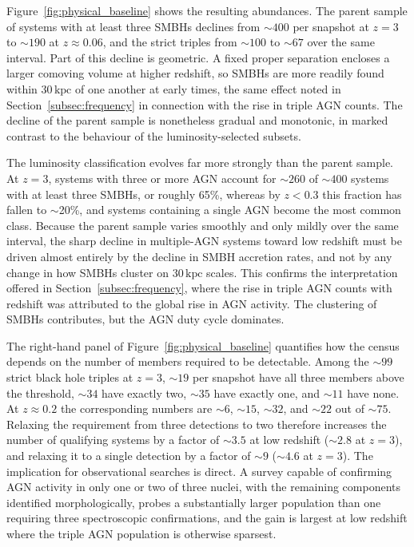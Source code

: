 \documentclass[twocolumn, 10pt]{article}
\begin{document}
Figure~\ref{fig:physical_baseline} shows the resulting abundances. The parent sample of systems with at least three SMBHs declines from $\sim 400$ per snapshot at $z = 3$ to $\sim 190$ at $z \approx 0.06$, and the strict triples from $\sim 100$ to $\sim 67$ over the same interval. Part of this decline is geometric. A fixed proper separation encloses a larger comoving volume at higher redshift, so SMBHs are more readily found within $30\,\mathrm{kpc}$ of one another at early times, the same effect noted in Section~\ref{subsec:frequency} in connection with the rise in triple AGN counts. The decline of the parent sample is nonetheless gradual and monotonic, in marked contrast to the behaviour of the luminosity-selected subsets.

The luminosity classification evolves far more strongly than the parent sample. At $z = 3$, systems with three or more AGN account for $\sim 260$ of $\sim 400$ systems with at least three SMBHs, or roughly 65\%, whereas by $z < 0.3$ this fraction has fallen to $\sim$20\%, and systems containing a single AGN become the most common class. Because the parent sample varies smoothly and only mildly over the same interval, the sharp decline in multiple-AGN systems toward low redshift must be driven almost entirely by the decline in SMBH accretion rates, and not by any change in how SMBHs cluster on $30\,\mathrm{kpc}$ scales. This confirms the interpretation offered in Section~\ref{subsec:frequency}, where the rise in triple AGN counts with redshift was attributed to the global rise in AGN activity. The clustering of SMBHs contributes, but the AGN duty cycle dominates.

The right-hand panel of Figure~\ref{fig:physical_baseline} quantifies how the census depends on the number of members required to be detectable. Among the $\sim 99$ strict black hole triples at $z = 3$, $\sim 19$ per snapshot have all three members above the threshold, $\sim 34$ have exactly two, $\sim 35$ have exactly one, and $\sim 11$ have none. At $z \approx 0.2$ the corresponding numbers are $\sim 6$, $\sim 15$, $\sim 32$, and $\sim 22$ out of $\sim 75$. Relaxing the requirement from three detections to two therefore increases the number of qualifying systems by a factor of $\sim 3.5$ at low redshift ($\sim 2.8$ at $z = 3$), and relaxing it to a single detection by a factor of $\sim 9$ ($\sim 4.6$ at $z = 3$). The implication for observational searches is direct. A survey capable of confirming AGN activity in only one or two of three nuclei, with the remaining components identified morphologically, probes a substantially larger population than one requiring three spectroscopic confirmations, and the gain is largest at low redshift where the triple AGN population is otherwise sparsest.
\end{document}
